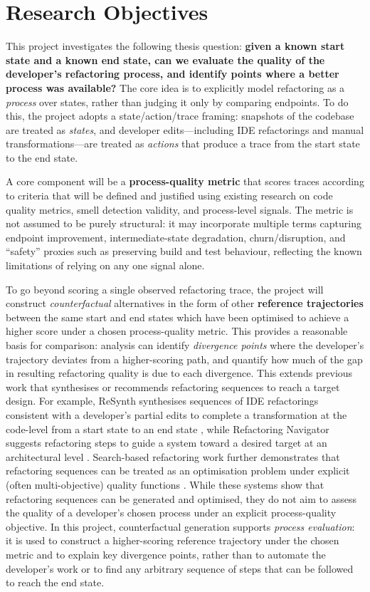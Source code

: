 \section{Research Objectives}

This project investigates the following thesis question: \textbf{given a known start state and a known end state, can we evaluate the quality of the developer’s refactoring process, and identify points where a better process was available?} The core idea is to explicitly model refactoring as a \textit{process} over states, rather than judging it only by comparing endpoints. To do this, the project adopts a state/action/trace framing: snapshots of the codebase are treated as \textit{states}, and developer edits—including IDE refactorings and manual transformations—are treated as \textit{actions} that produce a trace from the start state to the end state.

A core component will be a \textbf{process-quality metric} that scores traces according to criteria that will be defined and justified using existing research on code quality metrics, smell detection validity, and process-level signals. The metric is not assumed to be purely structural: it may incorporate multiple terms capturing endpoint improvement, intermediate-state degradation, churn/disruption, and “safety” proxies such as preserving build and test behaviour, reflecting the known limitations of relying on any one signal alone.

To go beyond scoring a single observed refactoring trace, the project will construct \emph{counterfactual} alternatives in the form of other \textbf{reference trajectories} between the same start and end states which have been optimised to achieve a higher score under a chosen process-quality metric. This provides a reasonable basis for comparison: analysis can identify \emph{divergence points} where the developer's trajectory deviates from a higher-scoring path, and quantify how much of the gap in resulting refactoring quality is due to each divergence. This extends previous work that synthesises or recommends refactoring sequences to reach a target design. For example, ReSynth synthesises sequences of IDE refactorings consistent with a developer's partial edits to complete a transformation at the code-level from a start state to an end state \cite{raychev2013resynth}, while Refactoring Navigator suggests refactoring steps to guide a system toward a desired target at an architectural level \cite{lin2016navigator}. Search-based refactoring work further demonstrates that refactoring sequences can be treated as an optimisation problem under explicit (often multi-objective) quality functions \cite{harman2007pareto,mohan2019manyobjective}. While these systems show that refactoring sequences can be generated and optimised, they do not aim to assess the quality of a developer’s chosen process under an explicit process-quality objective. In this project, counterfactual generation supports \emph{process evaluation}: it is used to construct a higher-scoring reference trajectory under the chosen metric and to explain key divergence points, rather than to automate the developer’s work or to find any arbitrary sequence of steps that can be followed to reach the end state.

